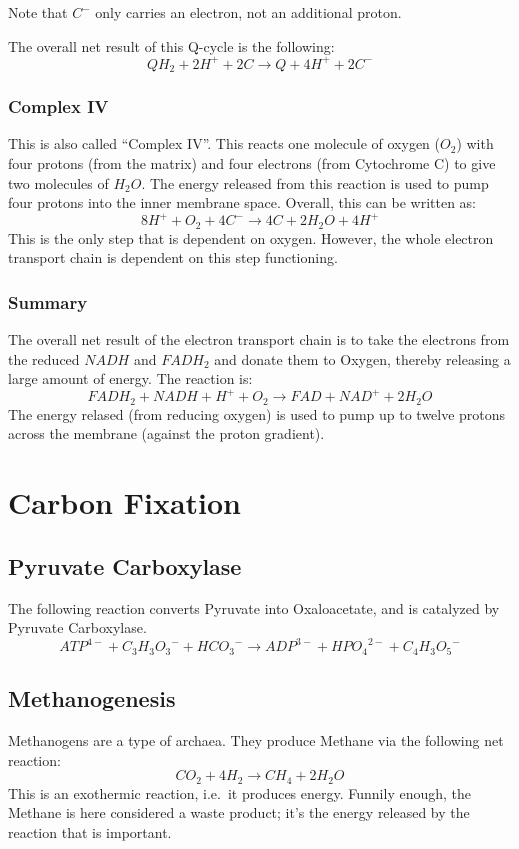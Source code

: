 \documentclass[a4paper,14pt]{extarticle}
\begin{document}
Note that $C^-$ only carries an electron, not an additional proton.

The overall net result of this Q-cycle is the following:
\[
    QH_2 + 2H^+ + 2C \rightarrow Q + 4H^+ + 2C^-
\]

\subsubsection{Complex IV}
This is also called ``Complex IV''.
This reacts one molecule of oxygen ($O_2$) with four protons (from the matrix) and four
electrons (from Cytochrome C) to give two molecules of $H_2O$. The energy released
from this reaction is used to pump four protons into the inner membrane space.
Overall, this can be written as:
\[
    8H^+ + O_2 + 4C^- \rightarrow 4C + 2H_2O + 4H^+
\]
This is the only step that is dependent on oxygen. However, the whole electron transport
chain is dependent on this step functioning.

\subsubsection{Summary}
The overall net result of the electron transport chain is to take the electrons from the
reduced $\mathit{NADH}$ and $\mathit{FADH_2}$ and donate them to Oxygen, thereby releasing
a large amount of energy. The reaction is:
\[
    FADH_2 + NADH + H^+ + O_2 \rightarrow FAD + NAD^+ + 2H_2O
\]
The energy relased (from reducing oxygen) is used to pump up to twelve protons across the
membrane (against the proton gradient).

\pagebreak
\section{Carbon Fixation}\label{sec_carbon_fixation}

\subsection{Pyruvate Carboxylase}
The following reaction converts Pyruvate into Oxaloacetate, and is catalyzed by Pyruvate
Carboxylase.
\[
    {ATP}^{4-} + {C_3H_3O_3}^- + {HCO_3}^- \rightarrow
    {ADP}^{3-} + {HPO_4}^{2-} + {C_4H_3O_5}^-
\]

\subsection{Methanogenesis}
Methanogens are a type of archaea. They produce Methane via the following net reaction:
\[
    CO_2 + 4H_2 \rightarrow CH_4 + 2H_2O
\]
This is an exothermic reaction, i.e.\ it produces energy. Funnily enough, the Methane
is here considered a waste product; it's the energy released by the reaction that is
important.
\end{document}

